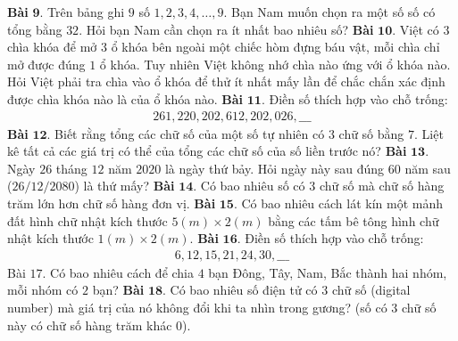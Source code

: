 \begin{multicols}{2}
	\begin{figure}[H]
		\centering
		\vspace*{-5pt}
		\captionsetup{labelformat= empty, justification=centering}
		\vspace*{-10pt}
	\end{figure}
	\textbf{\color{cackithi}Bài} $\pmb{9.}$ Trên bảng ghi $9$ số $1,2,3,4,\ldots,9$. Bạn Nam muốn chọn ra một số số có tổng bằng $32$. Hỏi bạn Nam cần chọn ra ít nhất bao nhiêu số?
	\vskip 0.1cm
	\textbf{\color{cackithi}Bài} $\pmb{10.}$ Việt có $3$ chìa khóa để mở $3$ ổ khóa bên ngoài một chiếc hòm đựng báu vật, mỗi chìa chỉ mở được đúng $1$ ổ khóa. Tuy nhiên Việt không nhớ chìa nào ứng với ổ khóa nào. Hỏi Việt phải  tra chìa vào ổ khóa để thử ít nhất mấy lần để chắc chắn xác định được chìa khóa nào là của ổ khóa nào.
	\vskip 0.1cm
	\textbf{\color{cackithi}Bài} $\pmb{11.}$ Điền số thích hợp vào chỗ trống:
	\begin{align*}
		261, 220, 202, 612, 202, 026, \_\_\_
	\end{align*}
	\textbf{\color{cackithi}Bài} $\pmb{12.}$ Biết rằng tổng các chữ số của một số tự nhiên có $3$ chữ số bằng $7$. Liệt kê tất cả các giá trị có thể của tổng các chữ số của số liền trước nó? 
	\vskip 0.1cm
	\textbf{\color{cackithi}Bài} $\pmb{13.}$ Ngày $26$ tháng $12$ năm $2020$ là ngày thứ bảy. Hỏi ngày này sau đúng $60$ năm sau ($26/12/2080$) là thứ mấy?
	\vskip 0.1cm
	\textbf{\color{cackithi}Bài} $\pmb{14.}$ Có bao nhiêu số có $3$ chữ số mà chữ số hàng trăm lớn hơn chữ số hàng đơn vị.
	\vskip 0.1cm
	\textbf{\color{cackithi}Bài} $\pmb{15.}$ Có bao nhiêu cách lát kín một mảnh đất hình chữ nhật kích thước $5(m)\times2(m)$ bằng các tấm bê tông hình chữ nhật kích thước $1(m)\times2(m)$.
	\vskip 0.1cm
	\textbf{\color{cackithi}Bài} $\pmb{16.}$ Điền số thích hợp vào chỗ trống:
	\begin{align*}
		6, 12, 15, 21, 24, 30, \_\_\_
	\end{align*}
	\vskip 0.1cm
	Bài $17$. Có bao nhiêu cách để chia $4$ bạn Đông, Tây, Nam, Bắc thành hai nhóm, mỗi nhóm có $2$ bạn?
	\vskip 0.1cm
	\textbf{\color{cackithi}Bài} $\pmb{18.}$ Có bao nhiêu số điện tử có $3$ chữ số (digital number) mà giá trị của nó không đổi khi ta nhìn trong gương? (số có $3$ chữ số này có chữ số hàng trăm khác $0$).

\end{multicols}
